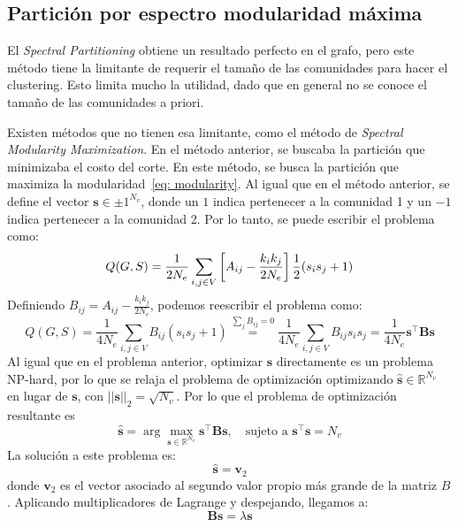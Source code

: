 \documentclass{article}
\begin{document}
\subsection{Partición por espectro modularidad máxima}


El \emph{Spectral Partitioning} obtiene un resultado perfecto en el grafo, pero este método tiene la limitante de requerir el tamaño de las comunidades para hacer el clustering. Esto limita mucho la utilidad, dado que en general no se conoce el tamaño de las comunidades a priori.


Existen métodos que no tienen esa limitante, como el método de \emph{Spectral Modularity Maximization}. En el método anterior, se buscaba la partición que minimizaba el costo del corte. En este método, se busca la partición que maximiza la modularidad~\eqref{eq: modularity}. Al igual que en el método anterior, se define el vector $\mathbf{s}\in{\pm 1}^{N_v}$, donde un $1$ indica pertenecer a la comunidad 1 y un $-1$ indica pertenecer a la comunidad 2. Por lo tanto, se puede escribir el problema como:
\begin{equation*}
    Q(G, S) = \frac{1}{2N_e} \sum_{i,j\in V}\left[A_{ij} - \frac{k_i k_j}{2N_e}\right] \frac{1}{2}(s_is_j + 1) \\
\end{equation*}
Definiendo $B_{ij} = A_{ij} - \frac{k_i k_j}{2N_e}$, podemos reescribir el problema como:
\begin{equation*}
    Q(G, S) = \frac{1}{4N_e} \sum_{i,j\in V}B_{ij}(s_is_j + 1) \stackrel{\sum_jB_{ij} = 0}{=} \frac{1}{4N_e} \sum_{i,j\in V}B_{ij}s_is_j = \frac{1}{4N_e} \mathbf{s}^\top \mathbf{B} \mathbf{s}
\end{equation*}
Al igual que en el problema anterior, optimizar $\mathbf{s}$ directamente es un problema NP-hard, por lo que se relaja el problema de optimización optimizando $\mathbf{\hat{s}} \in \mathbb{R}^{N_v}$ en lugar de $\mathbf{s}$, con $||\mathbf{s}||_2 = \sqrt{N_v}$.
Por lo que el problema de optimización resultante es
\begin{equation*}
    \mathbf{\hat{s}} = \arg \max_{\mathbf{s}\in{\mathbb{R}}^{N_v}} \mathbf{s}^\top \mathbf{B} \mathbf{s}, \quad \text{sujeto a } \mathbf{s}^\top \mathbf{s} = N_v
\end{equation*}
La solución a este problema es:
\begin{equation*}
    \mathbf{\hat{s}} = \mathbf{v}_2
\end{equation*}
donde $\mathbf{v}_2$ es el vector asociado al segundo valor propio más grande de la matriz $B$. Aplicando multiplicadores de Lagrange y despejando, llegamos a:
\begin{equation*}
    \mathbf{B}\mathbf{s} = \lambda \mathbf{s}
\end{equation*}
\end{document}
